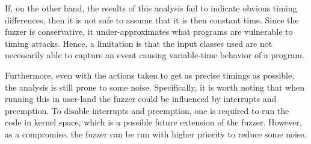 If, on the other hand, the results of this analysis fail to indicate obvious timing differences, then it is not safe to assume that it is then constant time. 
Since the fuzzer is conservative, it under-approximates what programs are vulnerable to timing attacks.
Hence, a limitation is that the input classes used are not necessarily able to capture an event causing variable-time behavior of a program. 

Furthermore, even with the actions taken to get as precise timings as possible, the analysis is still prone to some noise. 
Specifically, it is worth noting that when running this in user-land the fuzzer could be influenced by interrupts and preemption. 
To disable interrupts and preemption, one is required to run the code in kernel space, which is a possible future extension of the fuzzer. 
However, as a compromise, the fuzzer can be run with higher priority to reduce some noise. 
